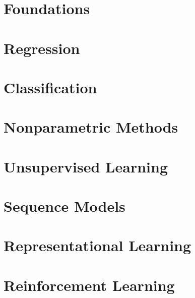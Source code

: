 \documentclass[12pt, a4paper, oneside, fleqn]{notes}
\begin{document}

\tableofcontents

\chapter{Foundations}


\chapter{Regression}


\chapter{Classification}


\chapter{Nonparametric Methods}


\chapter{Unsupervised Learning}


\chapter{Sequence Models}


\chapter{Representational Learning}


\chapter{Reinforcement Learning}
\end{document}

